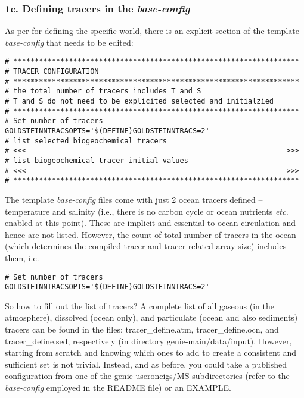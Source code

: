 \newpage 
%
\subsubsection{1c. Defining tracers in the \textit{base-config}}

As per for defining the specific world, there is an explicit section of the template \textit{base-config} that needs to be edited:

\footnotesize\vspace{-2pt}\begin{verbatim}
# *******************************************************************
# TRACER CONFIGURATION
# *******************************************************************
# the total number of tracers includes T and S
# T and S do not need to be explicited selected and initialzied
# *******************************************************************
# Set number of tracers
GOLDSTEINNTRACSOPTS='$(DEFINE)GOLDSTEINNTRACS=2'
# list selected biogeochemical tracers
# <<<                                                             >>>
# list biogeochemical tracer initial values
# <<<                                                             >>>
# *******************************************************************
\end{verbatim}\vspace{-2pt}\normalsize

The template \textit{base-config} files come with just 2 ocean tracers defined -- temperature and salinity (i.e., there is no carbon cycle or ocean nutrients \textit{etc.} enabled at this point). These are implicit and essential to ocean circulation and hence are not  listed. However, the count of total number of tracers in the ocean (which determines the compiled tracer and tracer-related array size) includes them, i.e.

\footnotesize\vspace{-2pt}\begin{verbatim}
# Set number of tracers
GOLDSTEINNTRACSOPTS='$(DEFINE)GOLDSTEINNTRACS=2'
\end{verbatim}\vspace{-2pt}\normalsize

So how to fill out the list of tracers? A complete list of all gaseous (in the atmosphere), dissolved (ocean only), and particulate (ocean and also sediments) tracers can be found in the files: \textsf{\footnotesize tracer\_define.atm}, \textsf{\footnotesize tracer\_define.ocn}, and \textsf{\footnotesize tracer\_define.sed}, respectively (in directory \textsf{\footnotesize genie-main/data/input}). However, starting from scratch and knowing which ones to add to create a consistent and sufficient set is not trivial. Instead, and as before, you could take a published configuration from one of the \textsf{\footnotesize genie-useroncigs/MS} subdirectories (refer to the \textit{base-config} employed in the README file) or an EXAMPLE.

